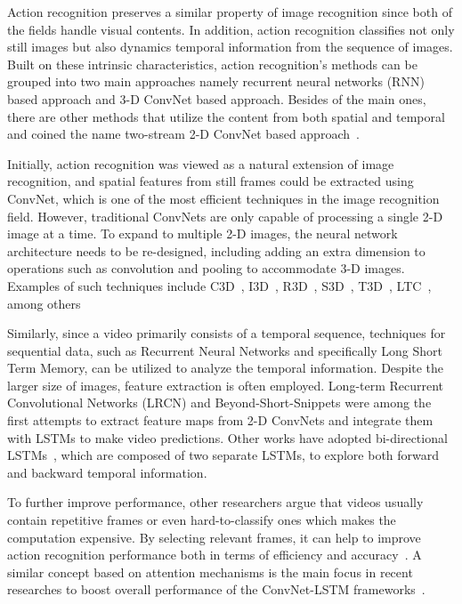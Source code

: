\documentclass[fleqn,10pt]{wlscirep}
\begin{document}
Action recognition preserves a similar property of image recognition since both of the fields handle visual contents. In addition, action recognition classifies not only still images but also dynamics temporal information from the sequence of images. Built on these intrinsic characteristics, action recognition's methods can be grouped into two main approaches namely recurrent neural networks (RNN) based approach and 3-D ConvNet based approach. Besides of the main ones, there are other methods that utilize the content from both spatial and temporal and coined the name two-stream 2-D ConvNet based approach~\cite{simonyan2014two}.





Initially, action recognition was viewed as a natural extension of image recognition, and spatial features from still frames could be extracted using ConvNet, which is one of the most efficient techniques in the image recognition field. However, traditional ConvNets are only capable of processing a single 2-D image at a time. To expand to multiple 2-D images, the neural network architecture needs to be re-designed, including adding an extra dimension to operations such as convolution and pooling to accommodate 3-D images. Examples of such techniques include C3D~\cite{tran2015learning}, I3D~\cite{carreira2017quo}, R3D~\cite{hara2018can}, S3D~\cite{xie2018rethinking}, T3D~\cite{diba2017temporal}, LTC~\cite{varol2017long}, among others



Similarly, since a video primarily consists of a temporal sequence, techniques for sequential data, such as Recurrent Neural Networks and specifically Long Short Term Memory, can be utilized to analyze the temporal information. Despite the larger size of images, feature extraction is often employed. Long-term Recurrent Convolutional Networks (LRCN)\cite{donahue2015long} and Beyond-Short-Snippets\cite{yue2015beyond} were among the first attempts to extract feature maps from 2-D ConvNets and integrate them with LSTMs to make video predictions. Other works have adopted bi-directional LSTMs~\cite{ullah2017action,he2021db}, which are composed of two separate LSTMs, to explore both forward and backward temporal information.

To further improve performance, other researchers argue that videos usually contain repetitive frames or even hard-to-classify ones which makes the computation expensive. By selecting relevant frames, it can help to improve action recognition performance both in terms of efficiency and accuracy~\cite{gowda2021smart}. A similar concept based on attention mechanisms is the main focus in recent researches to boost overall performance of the ConvNet-LSTM frameworks~\cite{ge2019attention,wu2019adaframe}. 
\end{document}
